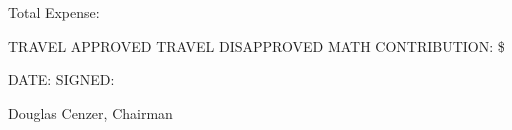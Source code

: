 \documentclass[•]{article}
\newcommand{\signature}{%
Douglas Cenzer, Chairman
}
\newcommand{\expenseTotal}{}
\newcommand{\fundingMath}{}
\newcommand{\fundingGrant}{}
\newcommand{\fundingCLAS}{}
\newcommand{\fundingOther}{}
\newcommand{\fundingMath}{%
0
}
\newcommand{\fundingGrant}{%
0
}
\newcommand{\fundingCLAS}{%
0
}
\newcommand{\fundingOther}{%
0
}
\begin{document}
Total Expense: 
\hfill 

\hrulefill

\vspace{10pt}

TRAVEL APPROVED \hspace{10pt} TRAVEL DISAPPROVED \hspace{10pt} MATH CONTRIBUTION: \$ \underline{\hspace{1.1in}}

\vspace{20pt}

DATE: \underline{\hspace{1in}} \hspace{1in} SIGNED: \underline{\hspace{3.15in}}

\hspace{3.5in} \signature
\end{document}
